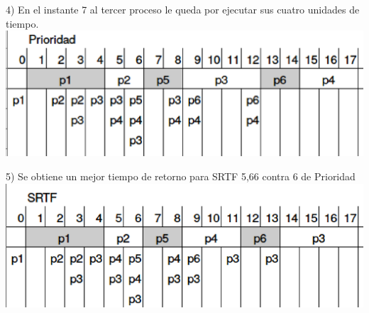 \documentclass[a4paper]{article}
\begin{document}
4) En el instante 7 al tercer proceso le queda por ejecutar sus cuatro
unidades de tiempo.\\
\includegraphics[scale=0.5]{Ejercicio-4.eps}

5) Se obtiene un mejor tiempo de retorno para SRTF 5,66 contra 6 de
Prioridad\\
\includegraphics[scale=0.5]{Ejercicio-5.eps}
\end{document}
